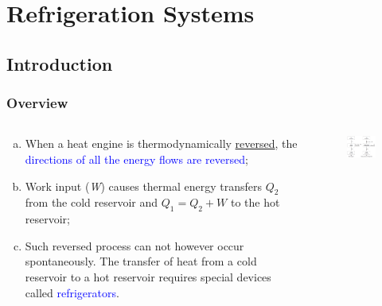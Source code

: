 \documentclass[10pt,compress]{beamer}
\begin{document}
\section{Refrigeration Systems}

\subsection{Introduction}

\begin{frame}
 \frametitle{Overview}
  \begin{columns}
   \begin{column}[c]{0.45\linewidth}
    \begin{enumerate}[(a)] 
     \item <1-> When a heat engine is thermodynamically \underline{reversed}, the \textcolor{blue}{directions of all the energy flows are reversed};
     \item <2-> Work input ({\it W}) causes thermal energy transfers $Q_{2}$ from the cold reservoir and $Q_{1}=Q_{2}+W$ to the hot reservoir; 
     \item <3-> Such reversed process can not however occur spontaneously. The transfer of heat from a cold reservoir to a hot reservoir requires special devices called \textcolor{blue}{refrigerators}.
    \end{enumerate}
   \end{column}
   \begin{column}[c]{0.55\linewidth}
    \begin{figure}%
     \begin{center}
      \includegraphics[width=6.5cm,clip]{./Pics/Overview_Refrig1}
     \end{center}
    \end{figure}  
   \end{column}  
  \end{columns}
\end{frame}
\end{document}
